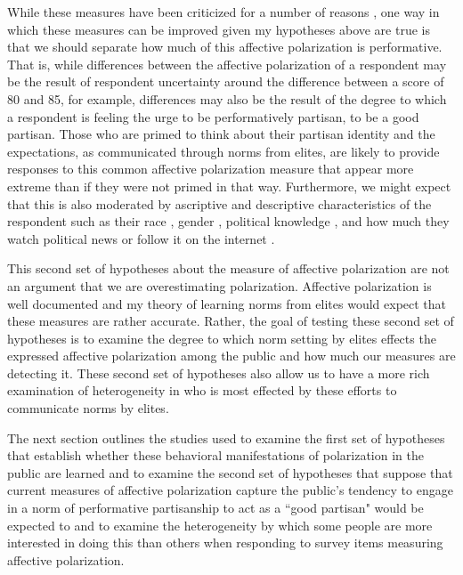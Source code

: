 \documentclass [12pt]{article}
\begin{document}
While these measures have been criticized for a number of reasons \citep[see][for example]{greene_2002, fiorina_abrams_2008, druckman_levendusky_2019}, one way in which these measures can be improved given my hypotheses above are true is that we should separate how much of this affective polarization is performative. That is, while differences between the affective polarization of a respondent may be the result of respondent uncertainty around the difference between a score of 80 and 85, for example, differences may also be the result of the degree to which a respondent is feeling the urge to be performatively partisan, to be a good partisan. Those who are primed to think about their partisan identity and the expectations, as communicated through norms from elites, are likely to provide responses to this common affective polarization measure that appear more extreme than if they were not primed in that way. Furthermore, we might expect that this is also moderated by ascriptive and descriptive characteristics of the respondent such as their race \citep[see][]{white_laird_2016}, gender \citep[see][]{kaufman_petrocik_1996}, political knowledge \citep[see][]{delli-carpini_keeter_1996}, and how much they watch political news or follow it on the internet \citep[see][]{prior_2007}.

This second set of hypotheses about the measure of affective polarization are not an argument that we are overestimating polarization. Affective polarization is well documented and my theory of learning norms from elites would expect that these measures are rather accurate. Rather, the goal of testing these second set of hypotheses is to examine the degree to which norm setting by elites effects the expressed affective polarization among the public and how much our measures are detecting it. These second set of hypotheses also allow us to have a more rich examination of heterogeneity in who is most effected by these efforts to communicate norms by elites. 

The next section outlines the studies used to examine the first set of hypotheses that establish whether these behavioral manifestations of polarization in the public are learned and to examine the second set of hypotheses that suppose that current measures of affective polarization capture the public's tendency to engage in a norm of performative partisanship to act as a ``good partisan" would be expected to and to examine the heterogeneity by which some people are more interested in doing this than others when responding to survey items measuring affective polarization.
\end{document}
